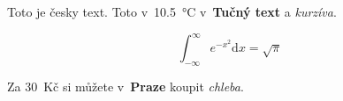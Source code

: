 Toto je česky text. Toto v~10.5~°C v~\textbf{Tučný text} a
\emph{kurzíva}.

\[\int_{-\infty}^{\infty} e^{-x^2} \mathrm{d}x = \sqrt{\pi}\]

Za 30~Kč si můžete v~\textbf{Praze} koupit \emph{chleba}.

